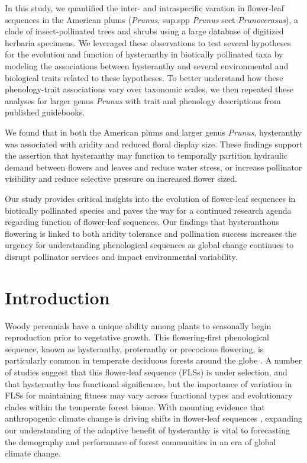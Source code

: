 \documentclass{article}[11pt]
\begin{document}
In this study, we quantified the inter- and intraspecific varation in flower-leaf sequences in the American plums (\emph{Prunus}, sup.spp \emph{Prunus} sect \emph{Prunocerasus}), a clade of insect-pollinated trees and shrubs using a large database of digitized herbaria specimens. We leveraged these observations to test several hypotheses for the evolution and function of hysteranthy in biotically pollinated taxa by modeling the associations between hysteranthy and several environmental and biological traits related to these hypotheses. To better understand how these phenology-trait associations vary over taxonomic scales, we then repeated these analyses for larger genus \emph{Prunus} with trait and phenology descriptions from published guidebooks.

We found that in both the American plums and larger genus \emph{Prunus}, hysteranthy was associated with aridity and reduced floral display size. These findings support the assertion that hysteranthy may function to temporally partition hydraulic demand between flowers and leaves and reduce water stress, or increase pollinator visibility and reduce selective pressure on increased flower sized.

Our study provides critical insights into the evolution of flower-leaf sequences in biotically pollinated species and paves the way for a continued research agenda regarding function of flower-leaf sequences. Our findings that hysteranthous flowering is linked to both aridity tolerance and pollination success increases the urgency for understanding phenological sequences as global change continues to disrupt pollinator services and impact environmental variability. 


\section*{Introduction}
\noindent Woody perennials have a unique ability among plants to seasonally begin reproduction prior to vegetative growth. This flowering-first phenological sequence, known as hysteranthy, proteranthy or precocious flowering, is particularly common in temperate deciduous forests around the globe \citep{Rathcke_1985}. A number of studies suggest that this flower-leaf sequence (FLSs) is under selection, and that hysteranthy has functional significance, but the importance of variation in FLSs for maintaining fitness \citep{Gougherty2018,Buonaiuto2020,Guo2014} may vary across functional types and evolutionary clades within the temperate forest biome. With mounting evidence that anthropogenic climate change is driving shifts in flower-leaf sequences \citep{Ma2020:aa}, expanding our understanding of the adaptive benefit of hysteranthy is vital to forecasting the demography and performance of forest communities in an era of global climate change.
\end{document}
